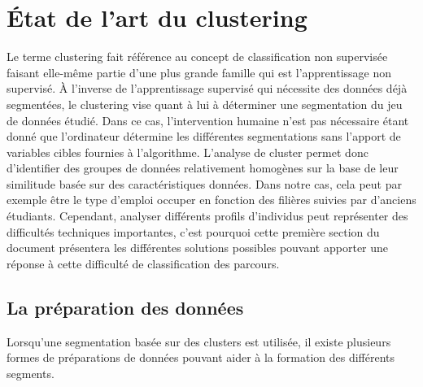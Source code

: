 \documentclass[memoire.tex]{subfiles}
\begin{document}
\chapter{État de l'art du clustering}
Le terme clustering fait référence au concept de classification non supervisée faisant elle-même partie d'une plus grande famille qui est l'apprentissage non supervisé. À l'inverse de l'apprentissage supervisé qui nécessite des données déjà segmentées, le clustering vise quant à lui à déterminer une segmentation du jeu de données étudié. Dans ce cas, l'intervention humaine n'est pas nécessaire étant donné  que l'ordinateur détermine les différentes segmentations sans l'apport de variables cibles fournies à l'algorithme.
L'analyse de cluster permet donc d'identifier des groupes de données relativement homogènes sur la base de leur similitude basée sur des caractéristiques données. Dans notre cas, cela peut par exemple être le type d'emploi occuper en fonction des filières suivies par d'anciens étudiants. Cependant, analyser différents profils d'individus peut représenter des difficultés techniques importantes, c'est pourquoi cette première section du document présentera les différentes solutions possibles pouvant apporter une réponse à cette difficulté de classification des parcours.
\section{La préparation des données}
Lorsqu'une segmentation basée sur des clusters est utilisée, il existe plusieurs formes de préparations de données pouvant aider à la formation des différents segments. 
\end{document}
